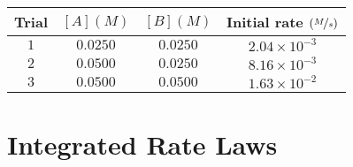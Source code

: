 \documentclass[12pt, openany, letterpaper]{memoir}
\begin{document}
\begin{itemize}
	
	\begin{tabular}{c|c|c|c}
		Trial & $\left[A\right](M)$ & $\left[B\right](M)$ & Initial rate $\left(\nicefrac{M}{s}\right)$ \\ \midrule
		$1$ & $0.0250$ & $0.0250$ & $2.04\times10^{-3}$ \\
		$2$ & $0.0500$ & $0.0250$ & $8.16\times10^{-3}$ \\
		$3$ & $0.0500$ & $0.0500$ & $1.63\times10^{-2}$ \\
	\end{tabular}
\end{itemize}

\section{Integrated Rate Laws}
\end{document}
